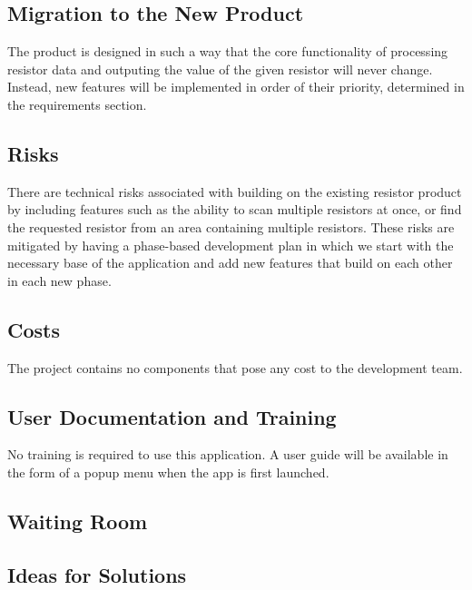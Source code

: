 \documentclass{article}
\begin{document}
\subsection{Migration to the New Product}
The product is designed in such a way that the core functionality of processing resistor data and outputing the value of the given resistor will never change. Instead, new features will be implemented in order of their priority, determined in the requirements section.

\subsection{Risks}
There are technical risks associated with building on the existing resistor product by including features such as the ability to scan multiple resistors at once, or find the requested resistor from an area containing multiple resistors. These risks are mitigated by having a phase-based development plan in which we start with the necessary base of the application and add new features that build on each other in each new phase.

\subsection{Costs}
The project contains no components that pose any cost to the development team.

\subsection{User Documentation and Training}
No training is required to use this application. A user guide will be available in the form of a popup menu when the app is first launched.

\subsection{Waiting Room}


\subsection{Ideas for Solutions}
\end{document}
